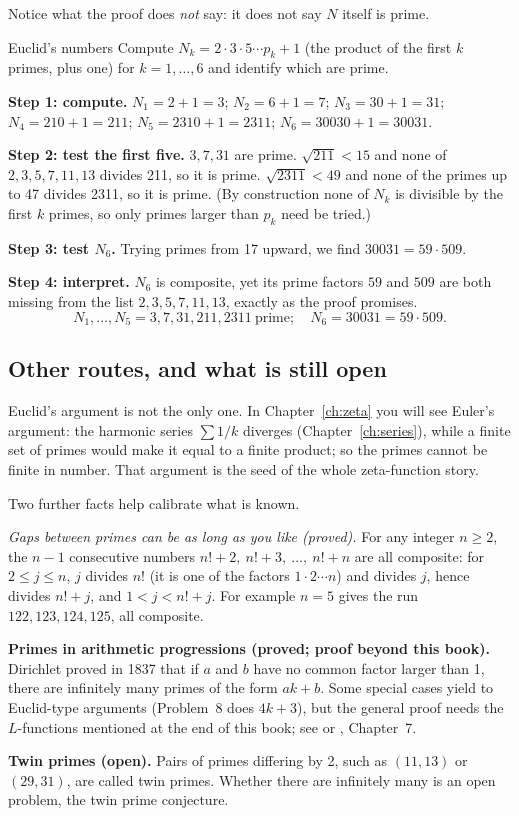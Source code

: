 Notice what the proof does \emph{not} say: it does not say $N$ itself is prime.

\begin{sample}{Euclid's numbers}
Compute $N_k=2\cdot3\cdot5\cdots p_k+1$ (the product of the first $k$ primes, plus one) for $k=1,\dots,6$ and identify which are prime.

\textbf{Step 1: compute.} $N_1=2+1=3$; $N_2=6+1=7$; $N_3=30+1=31$; $N_4=210+1=211$; $N_5=2310+1=2311$; $N_6=30030+1=30031$.

\textbf{Step 2: test the first five.} $3,7,31$ are prime. $\sqrt{211}<15$ and none of $2,3,5,7,11,13$ divides 211, so it is prime. $\sqrt{2311}<49$ and none of the primes up to 47 divides 2311, so it is prime. (By construction none of $N_k$ is divisible by the first $k$ primes, so only primes larger than $p_k$ need be tried.)

\textbf{Step 3: test $N_6$.} Trying primes from 17 upward, we find $30031=59\cdot509$.

\textbf{Step 4: interpret.} $N_6$ is composite, yet its prime factors $59$ and $509$ are both missing from the list $2,3,5,7,11,13$, exactly as the proof promises.
\[
\boxed{N_1,\dots,N_5=3,7,31,211,2311\ \text{prime};\quad N_6=30031=59\cdot509.}
\]
\end{sample}

\subsection{Other routes, and what is still open}

Euclid's argument is not the only one. In Chapter~\ref{ch:zeta} you will see Euler's argument: the harmonic series $\sum1/k$ diverges (Chapter~\ref{ch:series}), while a finite set of primes would make it equal to a finite product; so the primes cannot be finite in number. That argument is the seed of the whole zeta-function story.

Two further facts help calibrate what is known.

\emph{Gaps between primes can be as long as you like (proved).} For any integer $n\ge2$, the $n-1$ consecutive numbers $n!+2,\ n!+3,\ \dots,\ n!+n$ are all composite: for $2\le j\le n$, $j$ divides $n!$ (it is one of the factors $1\cdot2\cdots n$) and divides $j$, hence divides $n!+j$, and $1<j<n!+j$. For example $n=5$ gives the run $122,123,124,125$, all composite.

\begin{beyond}
\textbf{Primes in arithmetic progressions (proved; proof beyond this book).} Dirichlet proved in 1837 that if $a$ and $b$ have no common factor larger than 1, there are infinitely many primes of the form $a k+b$. Some special cases yield to Euclid-type arguments (Problem~8 does $4k+3$), but the general proof needs the $L$-functions mentioned at the end of this book; see \cite{davenport} or \cite{apostol}, Chapter~7.

\textbf{Twin primes (open).} Pairs of primes differing by 2, such as $(11,13)$ or $(29,31)$, are called twin primes. Whether there are infinitely many is an open problem, the twin prime conjecture.
\end{beyond}

